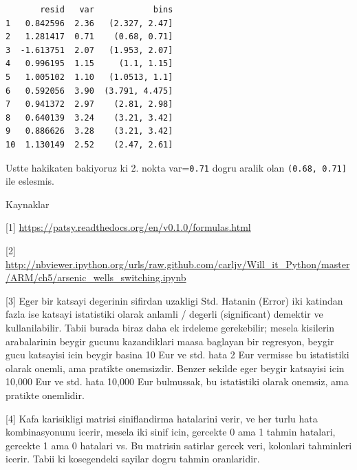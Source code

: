 \documentclass[12pt,fleqn]{article}\usepackage{../common}
\begin{document}
\begin{verbatim}
       resid   var            bins
1   0.842596  2.36   (2.327, 2.47]
2   1.281417  0.71    (0.68, 0.71]
3  -1.613751  2.07   (1.953, 2.07]
4   0.996195  1.15     (1.1, 1.15]
5   1.005102  1.10   (1.0513, 1.1]
6   0.592056  3.90  (3.791, 4.475]
7   0.941372  2.97    (2.81, 2.98]
8   0.640139  3.24    (3.21, 3.42]
9   0.886626  3.28    (3.21, 3.42]
10  1.130149  2.52    (2.47, 2.61]
\end{verbatim}

Ustte hakikaten bakiyoruz ki 2. nokta var=\verb!0.71! dogru
aralik olan \verb!(0.68, 0.71]! ile eslesmis.

Kaynaklar

[1] \url{https://patsy.readthedocs.org/en/v0.1.0/formulas.html}

[2] \url{http://nbviewer.ipython.org/urls/raw.github.com/carljv/Will_it_Python/master/ARM/ch5/arsenic_wells_switching.ipynb}

[3] Eger bir katsayi degerinin sifirdan uzakligi Std. Hatanin (Error) iki
katindan fazla ise katsayi istatistiki olarak anlamli / degerli
(significant) demektir ve kullanilabilir. Tabii burada biraz daha ek
irdeleme gerekebilir; mesela kisilerin arabalarinin beygir gucunu
kazandiklari maasa baglayan bir regresyon, beygir gucu katsayisi icin
beygir basina 10 Eur ve std. hata 2 Eur vermisse bu istatistiki olarak
onemli, ama pratikte onemsizdir. Benzer sekilde eger beygir katsayisi icin
10,000 Eur ve std. hata 10,000 Eur bulmussak, bu istatistiki olarak
onemsiz, ama pratikte onemlidir.

[4] Kafa karisikligi matrisi siniflandirma hatalarini verir, ve her turlu
hata kombinasyonunu icerir, mesela iki sinif icin, gercekte 0 ama 1 tahmin
hatalari, gercekte 1 ama 0 hatalari vs. Bu matrisin satirlar gercek veri,
kolonlari tahminleri icerir. Tabii ki kosegendeki sayilar dogru tahmin
oranlaridir.
\end{document}

